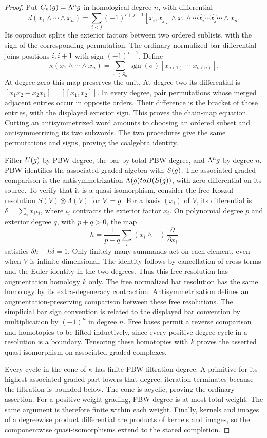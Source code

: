 \begin{proof}
Put $C_n(g)=\Lambda^ng$ in homological degree $n$, with differential
\[
 d(x_1\wedge\cdots\wedge x_n)
 =\sum_{i<j}(-1)^{i+j+1}[x_i,x_j]\wedge
 x_1\wedge\cdots\widehat{x_i}\cdots\widehat{x_j}\cdots\wedge x_n.
\]
Its coproduct splits the exterior factors between two ordered sublists,
with the sign of the corresponding permutation.
The ordinary normalized bar differential joins positions $i,i+1$ with sign $(-1)^{i-1}$.
Define
\[
 \kappa(x_1\wedge\cdots\wedge x_n)
 =\sum_{\sigma\in S_n}\operatorname{sgn}(\sigma)
 [x_{\sigma(1)}|\cdots|x_{\sigma(n)}].
\]
At degree zero this map preserves the unit.
At degree two its differential is $[x_1x_2-x_2x_1]=[[x_1,x_2]]$.
In every degree, pair permutations whose merged adjacent entries occur in opposite orders.
Their difference is the bracket of those entries, with the displayed exterior sign.
This proves the chain-map equation.
Cutting an antisymmetrized word amounts to choosing an ordered subset and
antisymmetrizing its two subwords.
The two procedures give the same permutations and signs, proving the coalgebra identity.

Filter $U(g)$ by PBW degree, the bar by total PBW degree, and $\Lambda^ng$ by degree $n$.
PBW identifies the associated graded algebra with $S(g)$.
The associated graded comparison is the antisymmetrization
$\Lambda(g)to B(S(g))$, with zero differential on its source.
To verify that it is a quasi-isomorphism, consider the free Koszul resolution
$S(V)\otimes\Lambda(V)$ for $V=g$.
For a basis $(x_i)$ of $V$, its differential is
$\delta=\sum_i x_i\iota_i$, where $\iota_i$ contracts the exterior factor $x_i$.
On polynomial degree $p$ and exterior degree $q$, with $p+q>0$, the map
\[
 h=\frac{1}{p+q}\sum_i (x_i\wedge -)\,\frac{\partial}{\partial x_i}
\]
satisfies $\delta h+h\delta=1$.
Only finitely many summands act on each element, even when $V$ is infinite-dimensional.
The identity follows by cancellation of cross terms and the Euler identity in the two degrees.
Thus this free resolution has augmentation homology $k$ only.
The free normalized bar resolution has the same homology by its extra-degeneracy contraction.
Antisymmetrization defines an augmentation-preserving comparison between these free resolutions.
The simplicial bar sign convention is related to the displayed bar convention by multiplication by $(-1)^n$ in degree $n$.
Free bases permit a reverse comparison and homotopies to be lifted inductively,
since every positive-degree cycle in a resolution is a boundary.
Tensoring these homotopies with $k$ proves the asserted quasi-isomorphism on associated graded complexes.

Every cycle in the cone of $\kappa$ has finite PBW filtration degree.
A primitive for its highest associated graded part lowers that degree;
iteration terminates because the filtration is bounded below.
The cone is acyclic, proving the ordinary assertion.
For a positive weight grading, PBW degree is at most total weight.
The same argument is therefore finite within each weight.
Finally, kernels and images of a degreewise product differential are products of kernels and images,
so the componentwise quasi-isomorphisms extend to the stated completion.
\end{proof}


